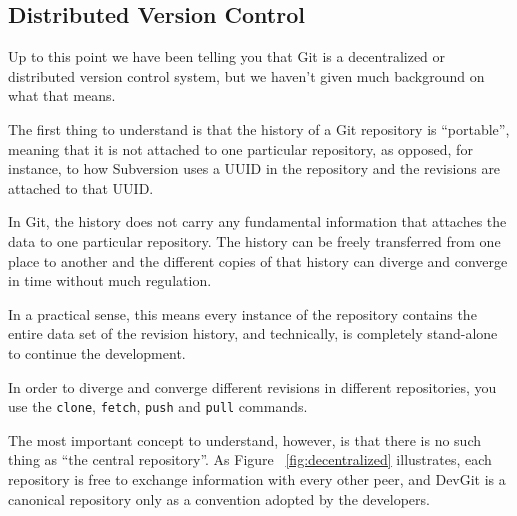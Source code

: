 \subsection{Distributed Version Control}

Up to this point we have been telling you that Git is a decentralized
or distributed version control system, but we haven't given much
background on what that means.

The first thing to understand is that the history of a
Git repository is ``portable'', meaning that it is not attached to one
particular repository, as opposed, for instance, to how Subversion
uses a UUID in the repository and the revisions are attached to that
UUID.

In Git, the history does not carry any fundamental information that
attaches the data to one particular repository. The
history can be freely transferred from one place to another and the
different copies of that history can diverge and converge in time
without much regulation.

In a practical sense, this means every instance of the repository
contains the entire data set of the revision history, and
technically, is completely stand-alone to continue the development.

In order to diverge and converge different revisions in different
repositories, you use the \texttt{clone}, \texttt{fetch},
\texttt{push} and \texttt{pull} commands.

The most important concept to understand, however, is that there is no
such thing as ``the central repository''. As Figure
~\ref{fig:decentralized} illustrates, each repository is free to
exchange information with every other peer, and DevGit is a
canonical repository only as a convention adopted by the developers.

